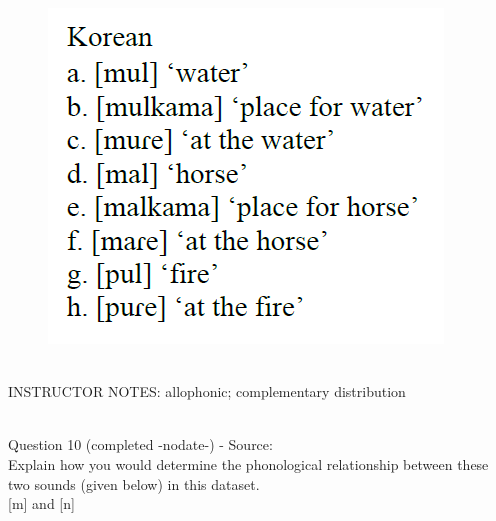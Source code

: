 \documentclass[12pt]{article}
\begin{document}
\begin{figure}[H]
\includegraphics{../images/korean.png}
\end{figure}

~\\
INSTRUCTOR NOTES: allophonic; complementary distribution


~\\

{\large Question 10} (completed -nodate-) - Source: \\

Explain how you would determine the phonological relationship between these two sounds (given below) in this dataset.\\

{[m]} and {[n]}
\end{document}
